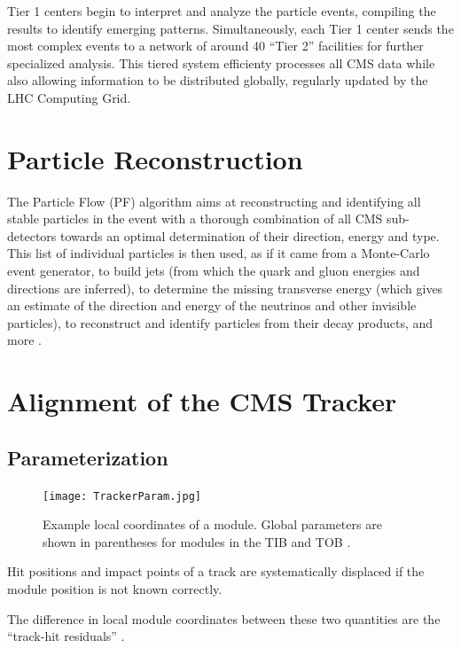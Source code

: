 Tier 1 centers begin to interpret and analyze the particle events, compiling the results to identify emerging patterns. Simultaneously, each Tier 1 center sends the most complex events to a network of around 40 ``Tier 2'' facilities for further specialized analysis. This tiered system efficienty processes all CMS data while also allowing information to be distributed globally, regularly updated by the LHC Computing Grid.

\section{Particle Reconstruction}

The Particle Flow (PF) algorithm aims at reconstructing and identifying all stable particles in the event with a thorough combination of all CMS sub-detectors towards an optimal determination of their direction, energy and type. This list of individual particles is then used, as if it came from a Monte-Carlo event generator, to build jets (from which the quark and gluon energies and directions are inferred), to determine the missing transverse energy (which gives an estimate of the direction and energy of the neutrinos and other invisible particles), to reconstruct and identify particles from their decay products, and more \cite{Beaudette:1645993}.

\section{Alignment of the CMS Tracker}

\subsection{Parameterization}

\begin{figure}[!htb]
    \begin{center}
        \texttt{[image: TrackerParam.jpg]}
        \caption{Example local coordinates of a module. Global parameters are shown in parentheses for modules in the TIB and TOB \cite{WAdam_2009}.}
        \label{fig:TrackerParam}
    \end{center}
\end{figure}

Hit positions and impact points of a track are systematically displaced if the module position is not known correctly.

The difference in local module coordinates between these two quantities are the ``track-hit residuals'' \cite{Karimaki:926537}.

